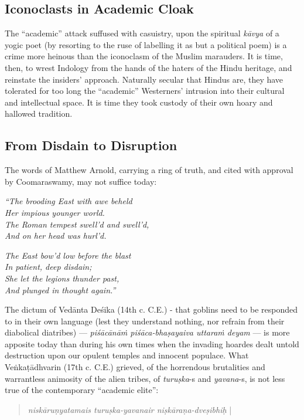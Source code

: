 \subsection*{Iconoclasts in Academic Cloak}

The “academic” attack suffused with casuistry, upon the spiritual {\sl kāvya} of a yogic poet (by resorting to the ruse of labelling it as but a political poem) is a crime more heinous than the iconoclasm of the Muslim marauders. It is time, then, to wrest Indology from the hands of the haters of the Hindu heritage, and reinstate the insiders’ approach. Naturally secular that Hindus are, they have  tolerated for too long the “academic” Westerners’ intrusion into their cultural and intellectual space. It is time they took custody of their own hoary and hallowed tradition.\\[-20pt] 

\subsection*{From Disdain to Disruption}

The words of Matthew Arnold, carrying a ring of truth, and cited with approval by Coomaraswamy, may not suffice today:

\begin{myquote}
{{\sl ``The brooding East with awe beheld}}\\
{\sl Her impious younger world.}\\
{\sl The Roman tempest swell'd and swell'd,}\\
{\sl And on her head was hurl'd.}
\end{myquote}


\begin{myquote}
{{\sl The East bow'd low before the blast}}\\
{\sl In patient, deep disdain;}\\
{\sl She let the legions thunder past,}\\
{\sl And plunged in thought again.''}
\end{myquote}

The dictum of Vedānta Deśika (14th c. C.E.) - that goblins need to be responded to in their own language (lest they understand nothing, nor refrain from their diabolical diatribes) --- {\sl piśācānāṁ piśāca-bhaṣayaiva uttaraṁ deyam} --- is more apposite today than during his own times when the invading hoardes dealt untold destruction upon our opulent temples and innocent populace. What Veṅkaṭādhvarin (17th c. C.E.) grieved, of the horrendous brutalities and warrantless animosity of the alien tribes, of {\sl turuṣka}-s and {\sl yavana}-s, is not less true of the contemporary ``academic elite'':
\begin{quote}
{{\sl niskāruṇyatamais turuṣka-yavanair niṣkāraṇa-dveṣibhiḥ}} |
\end{quote}

